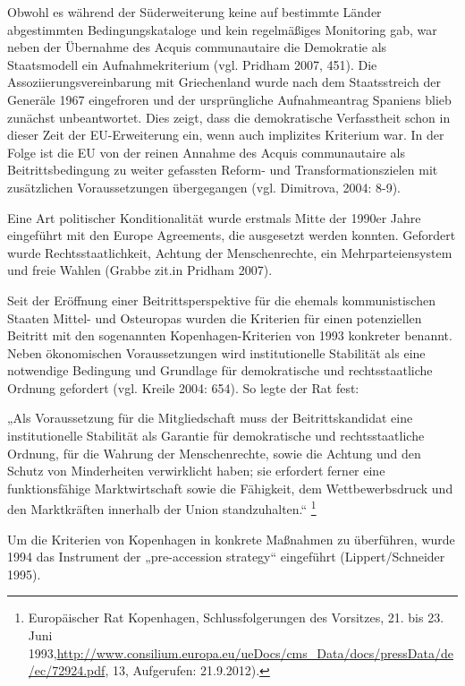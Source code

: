 Obwohl es während der Süderweiterung keine auf bestimmte Länder abgestimmten Bedingungskataloge und kein regelmäßiges Monitoring gab, war neben der Übernahme des Acquis communautaire die Demokratie als Staatsmodell ein Aufnahmekriterium (vgl. Pridham 2007, 451). Die Assoziierungsvereinbarung mit Griechenland wurde nach dem Staatsstreich der Generäle 1967 eingefroren und der ursprüngliche Aufnahmeantrag Spaniens blieb zunächst unbeantwortet. Dies zeigt, dass die demokratische Verfasstheit schon in dieser Zeit der EU-Erweiterung ein, wenn auch implizites Kriterium war. In der Folge ist die EU von der reinen Annahme des Acquis communautaire als Beitrittsbedingung zu weiter gefassten Reform- und Transformationszielen mit zusätzlichen Voraussetzungen übergegangen (vgl. Dimitrova, 2004: 8-9).\par
Eine Art politischer Konditionalität wurde erstmals Mitte der 1990er Jahre eingeführt mit den Europe Agreements, die ausgesetzt werden konnten. Gefordert wurde Rechtsstaatlichkeit, Achtung der Menschenrechte, ein Mehrparteiensystem und freie Wahlen (Grabbe zit.in Pridham 2007).\par
Seit der Eröffnung einer Beitrittsperspektive für die ehemals kommunistischen Staaten Mittel- und Osteuropas wurden die Kriterien für einen potenziellen Beitritt mit den sogenannten Kopenhagen-Kriterien von 1993 konkreter benannt. Neben ökonomischen Voraussetzungen wird institutionelle Stabilität als eine notwendige Bedingung und Grundlage für demokratische und rechtsstaatliche Ordnung gefordert (vgl. Kreile 2004: 654). So legte der Rat fest:\par

„Als Voraussetzung für die Mitgliedschaft muss der Beitrittskandidat eine institutionelle Stabilität als Garantie für demokratische und rechtsstaatliche Ordnung, für die Wahrung der Menschenrechte, sowie die Achtung und den Schutz von Minderheiten verwirklicht haben; sie erfordert ferner eine funktionsfähige Marktwirtschaft sowie die Fähigkeit, dem Wettbewerbsdruck und den Marktkräften innerhalb der Union standzuhalten.“ \footnote{Europäischer Rat Kopenhagen, Schlussfolgerungen des Vorsitzes, 21. bis 23. Juni 1993,\url{http://www.consilium.europa.eu/ueDocs/cms_Data/docs/pressData/de/ec/72924.pdf}, 13, Aufgerufen: 21.9.2012).}\par

Um die Kriterien von Kopenhagen in konkrete Maßnahmen zu überführen, wurde 1994 das Instrument der „pre-accession strategy“ eingeführt (Lippert/Schneider 1995). \par

